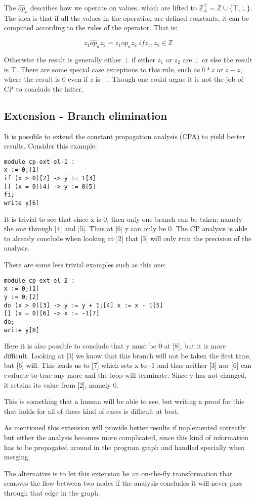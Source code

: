 \docpar
The $\hat{op}_a$ describes how we operate on values, which are lifted to
 $\mathbb{Z}^{\top}_{\bot} = \mathbb{Z} \cup \{ \top, \bot \}$. The idea is
that if all the values in the operation are defined constants, it can be
computed according to the rules of the operator. That is:

\[ z_1 \hat{op}_a z_2 = z_1 op_a z_2 \; if z_1, z_2 \in \mathbb{Z} \]

\docpar
Otherwise the result is generally either $\bot$ if either $z_1$ or $z_2$
are $\bot$ or else the result is $\top$. There are some special case
exceptions to this rule, such as $0 * z$ or $z - z$, where the result is
0 even if $z$ is $\top$. Though one could argue it is not the job of CP to
conclude the latter.

\subsection{Extension - Branch elimination}
It is possible to extend the constant propagation analysis (CPA) to yield better
results. Consider this example:

\begin{lstlisting}
module cp-ext-el-1 :
x := 0;[1]
if (x > 0)[2] -> y := 1[3]
[] (x = 0)[4] -> y := 0[5]
fi;
write y[6]
\end{lstlisting}

\docpar
It is trivial to see that since x is 0, then only one branch can be taken; namely
the one through [4] and [5]. Thus at [6] y can only be 0. The CP analysis is able
to already conclude when looking at [2] that [3] will only ruin the precision
of the analysis.

  There are some less trivial examples such as this one:

\begin{lstlisting}
module cp-ext-el-2 :
x := 0;[1]
y := 0;[2]
do (x > 0)[3] -> y := y + 1;[4] x := x - 1[5]
[] (x = 0)[6] -> x := -1[7]
do;
write y[8]
\end{lstlisting}

\docpar
Here it is also possible to conclude that y must be 0 at [8], but it is more
difficult. Looking at [3] we know that this branch will not be
taken the first time, but [6] will. This leads us to [7] which sets x to -1
and thus neither [3] nor [6] can evaluate to true any more and the loop will
terminate. Since y has not changed, it retains its value from [2], namely 0.

  This is something that a human will be able to see, but writing a proof for
this that holds for all of these kind of cases is difficult at best.

\docpar
As mentioned this extension will provide better results if implemented correctly
but either the analysis becomes more complicated, since this kind of information
has to be propagated around in the program graph and handled specially when
merging.

  The alternative is to let this extension be an on-the-fly transformation that
removes the flow between two nodes if the analysis concludes it will never pass
through that edge in the graph.

